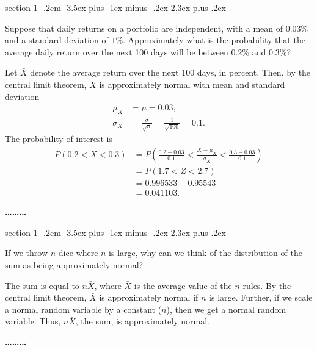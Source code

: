 \documentclass[11pt]{exam}
\makeatletter
\newenvironment{problem}{\@startsection
       {section}
       {1}
       {-.2em}
       {-3.5ex plus -1ex minus -.2ex}
       {2.3ex plus .2ex}
       {\pagebreak[3]%
       \large\bf\noindent{Problem }
       }
       }
       {%
       \begin{center}\large\bf \ldots\ldots\ldots\end{center}}
\makeatother
\begin{document}
\begin{problem}{}

Suppose that daily returns on a portfolio are independent, with a mean of
$0.03\%$ and a standard deviation of $1\%$.  Approximately what is the
probability that the average daily return over the next 100 days will be
between $0.2\%$ and $0.3\%$?

\begin{solution}

Let $\bar X$ denote the average return over the next 100 days, in percent.
Then, by the central limit theorem, $\bar X$ is approximately normal with mean
and standard deviation
\begin{align*}
  \mu_{\bar X} &= \mu = 0.03, \\
  \sigma_{\bar X} &= \frac{\sigma}{\sqrt{n}} = \frac{1}{\sqrt{100}} = 0.1.
\end{align*}
The probability of interest is
\begin{align*}
  P(0.2 < X < 0.3)
    &= P\left(\frac{0.2 - 0.03}{0.1}
          < \frac{X - \mu_{\bar X}}{\sigma_{\bar X}}
          < \frac{0.3 - 0.03}{0.1}\right) \\
    &= P(1.7 < Z < 2.7) \\
    &= 0.996533 - 0.95543 \\
    &= 0.041103.
\end{align*}
\end{solution}

\end{problem}



\begin{problem}{}

If we throw $n$ dice where $n$ is large, why can we think of the distribution
of the sum as being approximately normal?

\begin{solution}
The sum is equal to $n \bar X$, where $\bar X$ is the average value of the $n$
rules.  By the central limit theorem, $\bar X$ is approximately normal if $n$
is large.  Further, if we scale a normal random variable by a constant ($n$),
then we get a normal random variable.  Thus, $n \bar X$, the sum, is
approximately normal.
\end{solution}

\end{problem}
\end{document}
